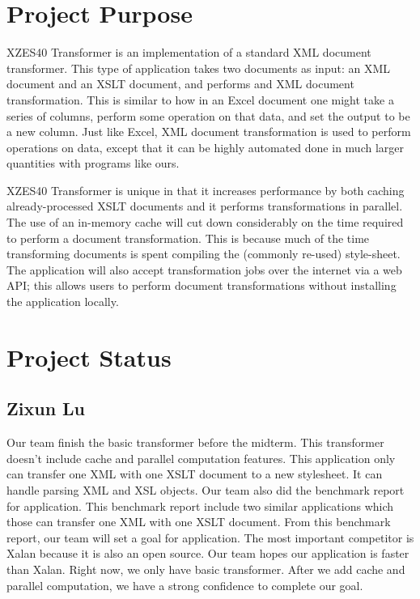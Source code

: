 \section{Project Purpose}

XZES40 Transformer is an implementation of a standard XML document transformer.
This type of application takes two documents as input: an XML document and an XSLT document, and performs and XML document transformation.
This is similar to how in an Excel document one might take a series of columns, perform some operation on that data, and set the output to be a new column.
Just like Excel, XML document transformation is used to perform operations on data, except that it can be highly automated done in much larger quantities with programs like ours.

XZES40 Transformer is unique in that it increases performance by both caching already-processed XSLT documents and it performs transformations in parallel.
The use of an in-memory cache will cut down considerably on the time required to perform a document transformation.
This is because much of the time transforming documents is spent compiling the (commonly re-used) style-sheet.
The application will also accept transformation jobs over the internet via a web API; this allows users to perform document transformations without installing the application locally.

\section{Project Status}

\subsection{Zixun Lu}

Our team finish the basic transformer before the midterm. 
This transformer doesn’t include cache and parallel computation features. 
This application only can transfer one XML with one XSLT document to a new stylesheet. 
It can handle parsing XML and XSL objects. 
Our team also did the benchmark report for application. 
This benchmark report include two similar applications which those can transfer one XML with one XSLT document. 
From this benchmark report, our team will set a goal for application. 
The most important competitor is Xalan because it is also an open source. 
Our team hopes our application is faster than Xalan. 
Right now, we only have basic transformer. 
After we add cache and parallel computation, we have a strong confidence to complete our goal. 

